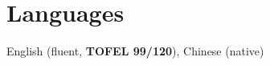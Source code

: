 \documentclass[letterpaper,11pt]{article}
\makeatletter
\newcommand{\resumeOrganizationHeading}[4]{
  \vspace{-2pt}\item
    \begin{tabular*}{0.97\textwidth}[t]{l@{\extracolsep{\fill}}r}
      \textbf{#1} & \textit{\small #2} \\
      \textit{\small#3}
    \end{tabular*}\vspace{-7pt}
}
\newcommand{\resumeSubHeadingListStart}{\begin{itemize}[leftmargin=0.15in, label={}]}
\newcommand{\resumeSubHeadingListEnd}{\end{itemize}}
\makeatother
\begin{document}

\section{Languages}
  \vspace{2pt}
  English (fluent, \textbf{\textbf{TOFEL 99/120}}), Chinese (native)




    
    




    
    








    



\end{document}
